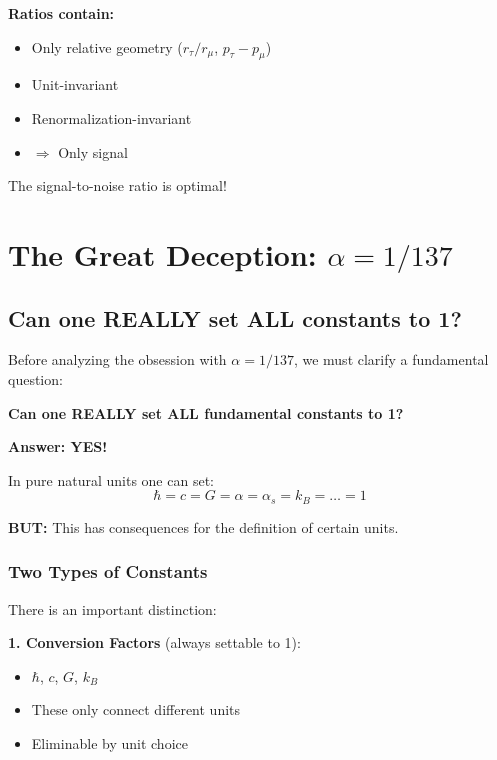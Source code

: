 \textbf{Ratios contain:}
\begin{itemize}[nosep]
	\item Only relative geometry ($r_\tau/r_\mu$, $p_\tau - p_\mu$)
	\item Unit-invariant
	\item Renormalization-invariant
	\item $\Rightarrow$ Only signal
\end{itemize}

The signal-to-noise ratio is optimal!

\section{The Great Deception: $\alpha = 1/137$}

\subsection{Can one REALLY set ALL constants to 1?}

Before analyzing the obsession with $\alpha = 1/137$, we must clarify a fundamental question:

\begin{important}
	\textbf{Can one REALLY set ALL fundamental constants to 1?}
	
	\textbf{Answer: YES!}
	
	In pure natural units one can set:
	\begin{equation}
		\hbar = c = G = \alpha = \alpha_s = k_B = \ldots = 1
	\end{equation}
	
	\textbf{BUT:} This has consequences for the definition of certain units.
\end{important}

\subsubsection{Two Types of Constants}

There is an important distinction:

\textbf{1. Conversion Factors} (always settable to 1):
\begin{itemize}[nosep]
	\item $\hbar$, $c$, $G$, $k_B$
	\item These only connect different units
	\item Eliminable by unit choice
\end{itemize}

